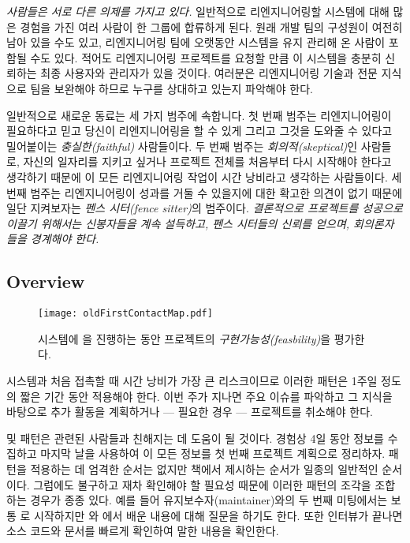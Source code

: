 \documentclass[a4paper,10pt,twoside]{book}
\begin{document}
\begin{bulletlist}
  \item \emph{사람들은 서로 다른 의제를 가지고 있다.}
일반적으로 리엔지니어링할 시스템에 대해 많은 경험을 가진 여러 사람이 한 그룹에 합류하게 된다. 원래 개발 팀의 구성원이 여전히 남아 있을 수도 있고, 리엔지니어링 팀에 오랫동안 시스템을 유지 관리해 온 사람이 포함될 수도 있다. 적어도 리엔지니어링 프로젝트를 요청할 만큼 이 시스템을 충분히 신뢰하는 최종 사용자와 관리자가 있을 것이다. 여러분은 리엔지니어링 기술과 전문 지식으로 팀을 보완해야 하므로 누구를 상대하고 있는지 파악해야 한다. 

일반적으로 새로운 동료는 세 가지 범주에 속합니다. 첫 번째 범주는 리엔지니어링이 필요하다고 믿고 당신이 리엔지니어링을 할 수 있게 그리고 그것을 도와줄 수 있다고 밀어붙이는 \emph{충실한(faithful)} 사람들이다. 두 번째 범주는 \emph{회의적(skeptical)}인 사람들로, 자신의 일자리를 지키고 싶거나 프로젝트 전체를 처음부터 다시 시작해야 한다고 생각하기 때문에 이 모든 리엔지니어링 작업이 시간 낭비라고 생각하는 사람들이다. 세 번째 범주는 리엔지니어링이 성과를 거둘 수 있을지에 대한 확고한 의견이 없기 때문에 일단 지켜보자는 \emph{펜스 시터(fence sitter)}의 범주이다. \emph{결론적으로 프로젝트를 성공으로 이끌기 위해서는 신봉자들을 계속 설득하고, 펜스 시터들의 신뢰를 얻으며, 회의론자들을 경계해야 한다.}

\end{bulletlist}

\subsection*{Overview}

\begin{figure}
\begin{center}
\texttt{[image: oldFirstContactMap.pdf]}
\caption{시스템에 을 진행하는 동안 프로젝트의 \emph{구현가능성(feasbility)}을 평가한다.}
\end{center}
\end{figure}

시스템과 처음 접촉할 때 시간 낭비가 가장 큰 리스크이므로 이러한 패턴은 1주일 정도의 짧은 기간 동안 적용해야 한다. 이번 주가 지나면 주요 이슈를 파악하고 그 지식을 바탕으로 추가 활동을 계획하거나 --- 필요한 경우 --- 프로젝트를 취소해야 한다.

 및  패턴은 관련된 사람들과 친해지는 데 도움이 될 것이다. 경험상 4일 동안 정보를 수집하고 마지막 날을 사용하여 이 모든 정보를 첫 번째 프로젝트 계획으로 정리하자. 패턴을 적용하는 데 엄격한 순서는 없지만 책에서 제시하는 순서가 일종의 일반적인 순서이다. 그럼에도 불구하고 재차 확인해야 할 필요성 때문에 이러한 패턴의 조각을 조합하는 경우가 종종 있다. 예를 들어 유지보수자(maintainer)와의 두 번째 미팅에서는 보통 로 시작하지만 와 에서 배운 내용에 대해 질문을 하기도 한다. 또한 인터뷰가 끝나면 소스 코드와 문서를 빠르게 확인하여 말한 내용을 확인한다.
\end{document}
